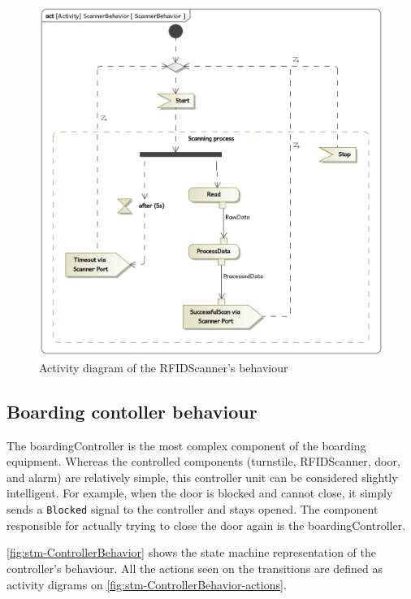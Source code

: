 \documentclass[a4paper]{article}
\begin{document}
\begin{figure}[hb]
	\includegraphics[width=\textwidth]{act-ScannerBehavior.jpg}
	\caption{Activity diagram of the \gls{RFIDScanner}'s behaviour}%
	\label{fig:act-ScannerBehavior}
\end{figure}


\subsection{Boarding contoller behaviour}

The \gls{boardingController} is the most complex component of the boarding
equipment. Whereas the controlled components (\gls{turnstile},
\gls{RFIDScanner}, door, and alarm) are relatively simple, this controller unit
can be considered slightly intelligent. For example, when the door is blocked
and cannot close, it simply sends a \texttt{Blocked} signal to the controller
and stays opened. The component responsible for actually trying to close the
door again is the \gls{boardingController}.

\cref{fig:stm-ControllerBehavior} shows the state machine representation of the
controller's behaviour. All the actions seen on the transitions are defined as
activity digrams on \cref{fig:stm-ControllerBehavior-actions}.
\end{document}
